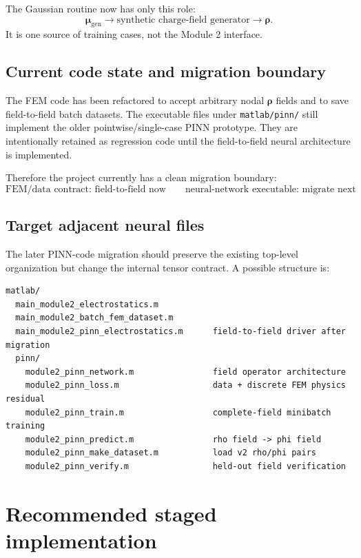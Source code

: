 \documentclass[11pt]{article}
\begin{document}
The Gaussian routine now has only this role:
\begin{equation}
\bm{\mu}_{\mathrm{gen}}
\longrightarrow
\text{synthetic charge-field generator}
\longrightarrow
\bm{\rho}.
\end{equation}
It is one source of training cases, not the Module 2 interface.

\subsection{Current code state and migration boundary}

The FEM code has been refactored to accept arbitrary nodal $\bm{\rho}$ fields and to save field-to-field batch datasets. The executable files under \texttt{matlab/pinn/} still implement the older pointwise/single-case PINN prototype. They are intentionally retained as regression code until the field-to-field neural architecture is implemented.

Therefore the project currently has a clean migration boundary:
\begin{equation}
\boxed{
\text{FEM/data contract: field-to-field now}
\qquad
\text{neural-network executable: migrate next}
}
\end{equation}

\subsection{Target adjacent neural files}

The later PINN-code migration should preserve the existing top-level organization but change the internal tensor contract. A possible structure is:
\begin{verbatim}
matlab/
  main_module2_electrostatics.m
  main_module2_batch_fem_dataset.m
  main_module2_pinn_electrostatics.m      field-to-field driver after migration
  pinn/
    module2_pinn_network.m                field operator architecture
    module2_pinn_loss.m                   data + discrete FEM physics residual
    module2_pinn_train.m                  complete-field minibatch training
    module2_pinn_predict.m                rho field -> phi field
    module2_pinn_make_dataset.m           load v2 rho/phi pairs
    module2_pinn_verify.m                 held-out field verification
\end{verbatim}

\section{Recommended staged implementation}
\end{document}
